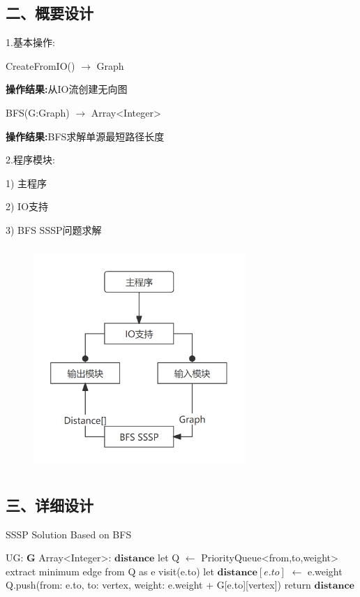 \documentclass[UTF8, a4paper]{ctexart}
\begin{document}
\subsection*{二、概要设计}
\par
1.\;基本操作: \par
	CreateFromIO() $\rightarrow$ Graph \par
	\qquad\textbf{操作结果:}\;从IO流创建无向图 \par
	BFS(G:Graph) $\rightarrow$ Array<Integer> \par
	\qquad\textbf{操作结果:}\;BFS求解单源最短路径长度 \par
2.\;程序模块: \par
1) 主程序 \par
2) IO支持 \par
3) BFS SSSP问题求解 \par
\begin{figure}[H]
	\begin{minipage}[t]{\linewidth}
		\centering
		\includegraphics[width=80mm,height=85mm]{./assets/DS08-1}
	\end{minipage}
\end{figure}

\subsection*{三、详细设计}
\begin{algorithm}[H]
\begin{algorithmic}[1]
\caption{SSSP Solution Based on BFS}
\Require UG: $\mathbf{G}$
\Ensure Array<Integer>: $\mathbf{distance}$
\State let Q $\gets$ PriorityQueue<from,to,weight>
	\State extract minimum edge from Q as e
	\State visit(e.to)
	\State let $\mathbf{distance}[e.to]$ $\gets$ e.weight
		\State Q.push({from: e.to, to: vertex, weight: e.weight + G[e.to][vertex]})
	\EndFor
\EndWhile
\State return $\mathbf{distance}$
\end{algorithmic}
\end{algorithm}
\end{document}

